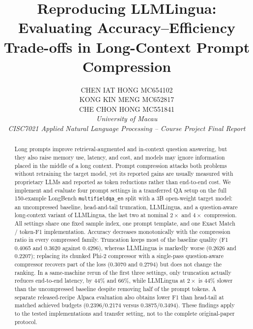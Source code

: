 ﻿\documentclass[10pt,a4paper,twocolumn]{article}
\title{Reproducing LLMLingua: Evaluating Accuracy--Efficiency Trade-offs in Long-Context Prompt Compression}
\author{
CHEN IAT HONG \quad MC654102\\
KONG KIN MENG \quad MC652817\\
CHE CHON HONG \quad MC551841\\
\textit{University of Macau}\\
\textit{CISC7021 Applied Natural Language Processing -- Course Project Final Report}
}
\date{}
\newcommand{\MFQA}{\texttt{multifieldqa\_\allowbreak en}}
\begin{document}
\maketitle
\vspace{-0.8cm}


\begin{abstract}
Long prompts improve retrieval-augmented and in-context question answering, but
they also raise memory use, latency, and cost, and models may ignore information
placed in the middle of a long context. Prompt compression attacks both problems
without retraining the target model, yet its reported gains are usually measured
with proprietary LLMs and reported as token reductions rather than end-to-end
cost. We implement and evaluate four prompt settings in a transferred QA setup on the full 150-example
LongBench \MFQA{} split with a 3B open-weight target model:
an uncompressed baseline, head-and-tail truncation, LLMLingua, and a
question-aware long-context variant of LLMLingua, the last two at nominal $2\times$
and $4\times$ compression. All settings share one fixed sample index, one prompt
template, and one Exact Match / token-F1 implementation. Accuracy decreases
monotonically with the compression ratio in every compressed family. Truncation
keeps most of the baseline quality (F1 0.4065 and 0.3620 against 0.4296), whereas
LLMLingua is markedly worse (0.2626 and 0.2207); replacing its chunked Phi-2
compressor with a single-pass question-aware compressor recovers part of the loss
(0.3070 and 0.2794) but does not change the ranking. In a same-machine rerun of
the first three settings, only truncation actually reduces end-to-end latency, by
44\% and 66\%, while LLMLingua at $2\times$ is 44\% slower than the uncompressed
baseline despite removing half of the prompt tokens. A separate released-recipe Alpaca evaluation also obtains lower F1 than head-tail at matched achieved budgets (0.2396/0.2174 versus 0.3875/0.3494). These findings apply to the tested implementations and transfer setting, not to the complete original-paper protocol.
\end{abstract}

\end{document}
